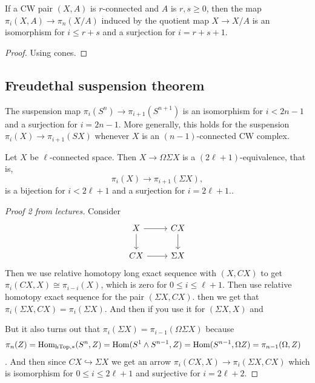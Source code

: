 \begin{remark}
\begin{prop}
	If a CW pair $(X,A)$ is $r$-connected and $A$ is $r,s \geq 0$, then the map $\pi_{i}(X,A)\to \pi_{n}(X/A)$ induced by the quotient map $X\to X/A$ is an isomorphism for $i\leq r+s$ and a surjection for $i=r+s+1$.
\end{prop}
\begin{proof}
	Using cones.
\end{proof}

\subsection{Freudethal suspension theorem}

\begin{coro}
	The suspension map $\pi_{i}(S^{n})\to \pi_{i+1}(S^{n+1})$ is an isomorphism for $i<2n-1$ and a surjection for $i=2n-1$. More generally, this holds for the suspension $\pi_{i}(X)\to \pi_{i+1}(SX)$ whenever $X$ is an $(n-1)$-connected CW complex.
\end{coro}
\begin{thm}
		Let $X$ be $\ell$-connected space. Then $X\to\Omega\Sigma X$ is a $(2\ell+1)$-equivalence, that is,
	$$\pi_i(X)\to \pi_{i+1}(\Sigma X),$$
	is a bijection for $i<2\ell+1$ and a surjection for $i=2\ell+1$..
\end{thm}
\begin{proof}[Proof 2 from lectures]
	Consider
	$$\begin{tikzcd}
		X\arrow[r]\arrow[d]&CX\arrow[d]\\
		CX\arrow[r]&\Sigma X
	\end{tikzcd}$$
	Then we use relative homotopy long exact sequence with $(X,CX)$ to get $\pi_i(CX,X)\cong\pi_{i-i}(X)$, which is zero for $0\leq i\leq \ell+1$. Then use relative homotopy exact sequence for the pair $(\Sigma X,CX)$. then we get that $\pi_i(\Sigma X,CX)=\pi_i(\Sigma X)$. And then if you use it for $(\Sigma X, X)$ and 
	
	But it also turns out that $\pi_i(\Sigma X)=\pi_{i-1}(\Omega\Sigma X)$ because
	\begin{align*}
		\pi_n(Z)&=\mathop{\mathrm{Hom}}\nolimits_{\text{hTop},*}(S^n,Z)=\mathop{\mathrm{Hom}}\nolimits(S^1\wedge S^{n-1},Z)=\text{Hom}(S^{n-1},\Omega Z)=\pi_{n-1}(\Omega,Z)
	\end{align*}.
	And then since $CX\hookrightarrow \Sigma X$ we get an arrow $\pi_i(CX,X)\to\pi_i(\Sigma X,CX)$ which is isomorphism for $0\leq i \leq 2\ell +1$ and surjective for $i=2\ell+2$.
	

\end{proof}
\end{remark}

